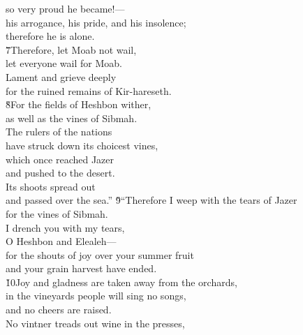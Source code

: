 \begin{poetry}
\poemll    so very proud he became!--- \\
\poeml his arrogance, his pride, and his insolence; \\
\poemll    therefore he is alone. \\
\poeml \v{7}Therefore, let Moab not wail, \\
\poemll    let everyone wail for Moab. \\
\poeml Lament and grieve deeply \\
\poemll    for the ruined remains of Kir-hareseth. \\
\poeml \v{8}For the fields of Heshbon wither, \\
\poemll    as well as the vines of Sibmah. \\
\poeml The rulers of the nations \\
\poeml have struck down its choicest vines, \\
\poeml which once reached Jazer \\
\poeml and pushed to the desert. \\
\poeml Its shoots spread out \\
\poeml and passed over the sea.''
\poeml \v{9}``Therefore I weep with the tears of Jazer \\
\poemll    for the vines of Sibmah. \\
\poeml I drench you with my tears, \\
\poemll    O Heshbon and Elealeh--- \\
\poeml for the shouts of joy over your summer fruit \\
\poemll    and your grain harvest have ended. \\
\poeml \v{10}Joy and gladness are taken away from the orchards, \\
\poemll    in the vineyards people will sing no songs, \\
\poeml and no cheers are raised. \\
\poemll    No vintner treads out wine in the presses, \\

\end{poetry}
